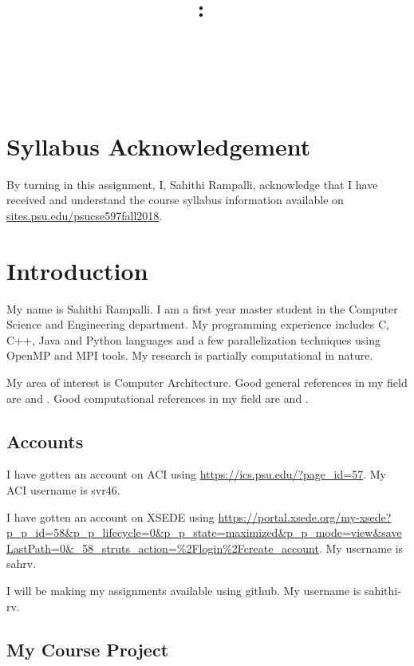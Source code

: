 \documentclass{article}
\title{\vspace{2in}\textmd{\textbf{\hmwkClass:\ \hmwkTitle}}\\\normalsize\vspace{0.1in}\small{\hmwkDueDate}\\\vspace{0.1in}\large{\textit{\hmwkClassInstructor\ \hmwkClassTime}}\vspace{3in}}
\date{}
\author{\textbf{\hmwkAuthorNameb} } %
\begin{document}
\begin{spacing}{1.1}
\maketitle

\newpage
\section{Syllabus Acknowledgement}

By turning in this assignment, I, Sahithi Rampalli, acknowledge that I have received and understand the course syllabus information available on \url{sites.psu.edu/psucse597fall2018}. 

\section{Introduction}

My name is Sahithi Rampalli.  I am a first year master student in the Computer Science and Engineering department. My programming experience includes C, C++, Java and Python languages and a few parallelization techniques using OpenMP and MPI tools. My research is partially computational in nature. 

My area of interest is Computer Architecture. Good general references in my field are \cite{Hennessy2017} and \cite{david2015}.  Good computational references in my field are \cite{Barnes1998} and \cite{Flynn2000}. 


\subsection{Accounts}

I have gotten an account on ACI using \url{https://ics.psu.edu/?page_id=57}.  My ACI username is svr46.

I have gotten an account on XSEDE using \url{https://portal.xsede.org/my-xsede?p_p_id=58&p_p_lifecycle=0&p_p_state=maximized&p_p_mode=view&saveLastPath=0&_58_struts_action=%2Flogin%2Fcreate_account}.  My username is sahrv.

I will be making my assignments available using github. My username is sahithi-rv. 

\subsection{My Course Project}


\end{spacing}
\end{document}
